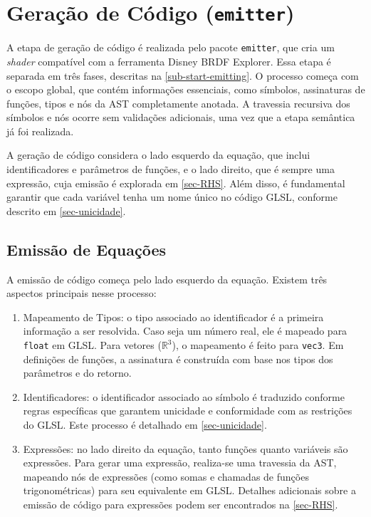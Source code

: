 
\section{Geração de Código (\texttt{emitter})} \label{section-emitter}


A etapa de geração de código é realizada pelo pacote \texttt{emitter}, que cria um \textit{shader} compatível com a ferramenta Disney BRDF Explorer. Essa etapa é separada em três fases, descritas na \autoref{sub-start-emitting}. O processo começa com o escopo global, que contém informações essenciais, como símbolos, assinaturas de funções, tipos e nós da AST completamente anotada. A travessia recursiva dos símbolos e nós ocorre sem validações adicionais, uma vez que a etapa semântica já foi realizada.

A geração de código considera o lado esquerdo da equação, que inclui identificadores e parâmetros de funções, e o lado direito, que é sempre uma expressão, cuja emissão é explorada em \autoref{sec-RHS}. Além disso, é fundamental garantir que cada variável tenha um nome único no código GLSL, conforme descrito em \autoref{sec-unicidade}.

\subsection{Emissão de Equações} \label{subsection-emission}

A emissão de código começa pelo lado esquerdo da equação. Existem três aspectos principais nesse processo:
\begin{enumerate}
    \item Mapeamento de Tipos: o tipo associado ao identificador é a primeira informação a ser resolvida. Caso seja um número real, ele é mapeado para \verb"float" em GLSL. Para vetores ($\mathbb{R}^3$), o mapeamento é feito para \verb"vec3". Em definições de funções, a assinatura é construída com base nos tipos dos parâmetros e do retorno.

    \item Identificadores: o identificador associado ao símbolo é traduzido conforme regras específicas que garantem unicidade e conformidade com as restrições do GLSL. Este processo é detalhado em \autoref{sec-unicidade}.

    \item Expressões: no lado direito da equação, tanto funções quanto variáveis são expressões. Para gerar uma expressão, realiza-se uma travessia da AST, mapeando nós de expressões (como somas e chamadas de funções trigonométricas) para seu equivalente em GLSL. Detalhes adicionais sobre a emissão de código para expressões podem ser encontrados na \autoref{sec-RHS}.
\end{enumerate}



